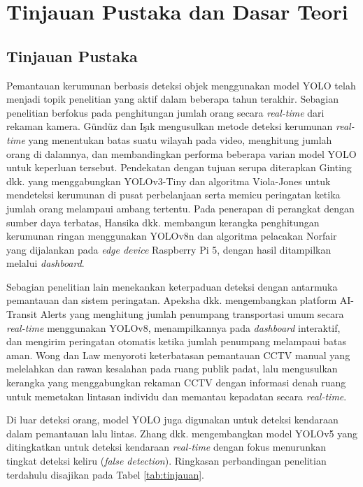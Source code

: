 \chapter{Tinjauan Pustaka dan Dasar Teori}

\section{Tinjauan Pustaka}

Pemantauan kerumunan berbasis deteksi objek menggunakan model YOLO telah menjadi topik 
penelitian yang aktif dalam beberapa tahun terakhir. Sebagian penelitian berfokus pada 
penghitungan jumlah orang secara \textit{real-time} dari rekaman kamera. Gündüz dan Işık 
\cite{gunduz2023new} mengusulkan metode deteksi kerumunan \textit{real-time} yang menentukan 
batas suatu wilayah pada video, menghitung jumlah orang di dalamnya, dan membandingkan 
performa beberapa varian model YOLO untuk keperluan tersebut. Pendekatan dengan tujuan 
serupa diterapkan Ginting dkk. \cite{ginting2021crowd} yang menggabungkan YOLOv3-Tiny dan 
algoritma Viola-Jones untuk mendeteksi kerumunan di pusat perbelanjaan serta memicu 
peringatan ketika jumlah orang melampaui ambang tertentu. Pada penerapan di perangkat 
dengan sumber daya terbatas, Hansika dkk. \cite{hansika2024privacy} membangun kerangka 
penghitungan kerumunan ringan menggunakan YOLOv8n dan algoritma pelacakan Norfair yang 
dijalankan pada \textit{edge device} Raspberry Pi 5, dengan hasil ditampilkan melalui 
\textit{dashboard}.

Sebagian penelitian lain menekankan keterpaduan deteksi dengan antarmuka pemantauan dan 
sistem peringatan. Apeksha dkk. \cite{apeksha2025transit} mengembangkan platform 
AI-Transit Alerts yang menghitung jumlah penumpang transportasi umum secara \textit{real-time} 
menggunakan YOLOv8, menampilkannya pada \textit{dashboard} interaktif, dan mengirim 
peringatan otomatis ketika jumlah penumpang melampaui batas aman. Wong dan Law 
\cite{wong2024fusion} menyoroti keterbatasan pemantauan CCTV manual yang melelahkan dan 
rawan kesalahan pada ruang publik padat, lalu mengusulkan kerangka yang menggabungkan 
rekaman CCTV dengan informasi denah ruang untuk memetakan lintasan individu dan memantau 
kepadatan secara \textit{real-time}.

Di luar deteksi orang, model YOLO juga digunakan untuk deteksi kendaraan dalam pemantauan 
lalu lintas. Zhang dkk. \cite{zhang2022realtime} mengembangkan model YOLOv5 yang 
ditingkatkan untuk deteksi kendaraan \textit{real-time} dengan fokus menurunkan tingkat deteksi 
keliru (\textit{false detection}). Ringkasan perbandingan penelitian terdahulu disajikan 
pada Tabel \ref{tab:tinjauan}.

